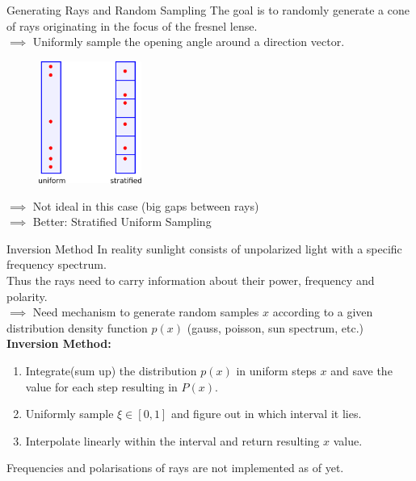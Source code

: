 \documentclass[aspectratio=43,t]{beamer}
\begin{document}
    
    \begin{frame}[fragile]{Generating Rays and Random Sampling}
		The goal is to randomly generate a cone of rays originating in the focus
		of the fresnel lense.\\
		\bigskip
		$\implies$ Uniformly sample the opening angle around a direction vector.

		\begin{figure}
		\centering
		\includegraphics[width=0.3\textwidth]{images/stratified.png}
		\end{figure}

		\bigskip
		$\implies$ Not ideal in this case (big gaps between rays)\\
		$\implies$ Better: Stratified Uniform Sampling
		\end{frame}

		\begin{frame}[fragile]{Inversion Method}
		In reality sunlight consists of unpolarized light with a specific frequency spectrum.\\
		Thus the rays need to carry information about their power, frequency and polarity.\\
		\bigskip
		$\implies$ Need mechanism to generate random samples $x$ according to 
			a given distribution density function $p(x)$ (gauss, poisson, sun spectrum, etc.)\\
		\bigskip
			\textbf{Inversion Method:}\\
      \begin{enumerate}
				\item<2-> Integrate(sum up) the distribution $p(x)$ in uniform steps $x$ and save
					the value for each step resulting in $P(x)$.
				\item<3-> Uniformly sample $\xi \in [0,1]$ and figure out in which interval it lies.
        \item<4-> Interpolate linearly within the interval and return resulting $x$ value.
      \end{enumerate}

		\bigskip
		\bigskip
		Frequencies and polarisations of rays are not implemented as of yet.
    \end{frame}
\end{document}
